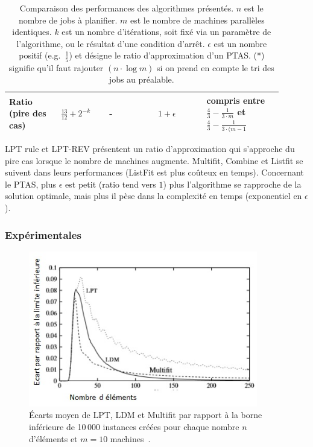 \documentclass[a4paper,12pt]{report}
\theoremstyle{plain}				%
\theoremstyle{definition}				%
\begin{document}
\begin{table}
\begin{center}
\begin{tabular}{p{0.17\linewidth}
				p{0.16\linewidth}
				p{0.16\linewidth}
				p{0.16\linewidth}
				p{0.25\linewidth}}
\\
Ratio \newline (pire des cas)		&
							$\frac{13}{12} + 2^{-k}$&		%
							-&								%
							$1 + \epsilon$	&				%
							compris entre \newline						%
								$\frac{4}{3}-\frac{1}{3 \cdot m}$ et	%
								\newline 								%
								$\frac{4}{3}-\frac{1}{3 \cdot (m-1}$	%

\\
\bottomrule
\end{tabular}
\end{center}
\caption{\label{table:synth}
Comparaison des performances des algorithmes présentés.
$n$ est le nombre de jobs à planifier.
$m$ est le nombre de machines parallèles identiques.
$k$ est un nombre d'itérations, soit  fixé via un paramètre de l'algorithme, ou le résultat d'une condition d'arrêt.
$\epsilon$ est un nombre positif (e.g.\ $\frac{1}{5}$) et désigne le ratio d'approximation d'un PTAS.
(*) signifie qu'il faut rajouter $(n \cdot \log m)$ si on prend en compte le tri des jobs au
préalable.
}
\end{table}

LPT rule et LPT-REV présentent un ratio d'approximation qui s'approche
du pire cas lorsque le nombre de machines augmente.
Multifit, Combine et Listfit se suivent dans leurs performances
(ListFit est plus coûteux en temps).
Concernant le PTAS, plus $\epsilon$ est petit (ratio tend vers $1$)
plus l'algorithme se rapproche de la solution optimale, mais plus il
pèse dans la complexité en temps (exponentiel en $\epsilon$).


\subsubsection{Expérimentales}

\begin{figure}
\centering
\includegraphics[width=10cm,height=6.80cm]
{Biblio_PCmax_Rendu_CompborneInf_LPT_LDM_MULTIFIT.jpg}
\caption{Écarts moyen de LPT, LDM et Multifit par rapport à la borne
  inférieure de 10\,000 instances créées pour chaque nombre $n$
  d'éléments et $m=10$ machines~\cite{michiels2003performance}.}
\label{comparaison:LPTLDMMFBorneInf}
\end{figure}
\end{document}
